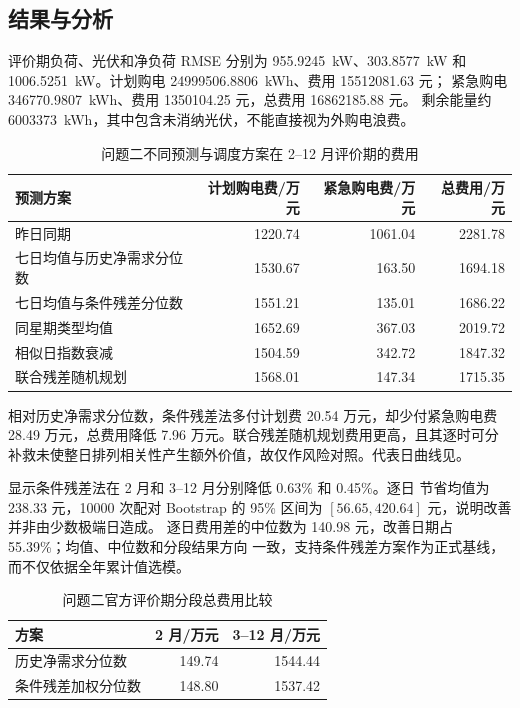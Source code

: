 \documentclass[withoutpreface,bwprint]{cumcmthesis}
\begin{document}
\subsection{结果与分析}

评价期负荷、光伏和净负荷 RMSE 分别为 \SI{955.9245}{kW}、\SI{303.8577}{kW} 和
\SI{1006.5251}{kW}。计划购电 \SI{24999506.8806}{kWh}、费用 \num{15512081.63} 元；
紧急购电 \SI{346770.9807}{kWh}、费用 \num{1350104.25} 元，总费用 \num{16862185.88} 元。
剩余能量约 \SI{6003373}{kWh}，其中包含未消纳光伏，不能直接视为外购电浪费。

\begin{table}[H]
  \centering
  \caption{问题二不同预测与调度方案在 2--12 月评价期的费用}
  \label{tab:q2-comparison}
  \begin{tabular}{lrrr}
    \toprule
    预测方案 & 计划购电费/万元 & 紧急购电费/万元 & 总费用/万元 \\
    \midrule
    昨日同期 & 1220.74 & 1061.04 & 2281.78 \\
    七日均值与历史净需求分位数 & 1530.67 & 163.50 & 1694.18 \\
    七日均值与条件残差分位数 & 1551.21 & 135.01 & 1686.22 \\
    同星期类型均值 & 1652.69 & 367.03 & 2019.72 \\
    相似日指数衰减 & 1504.59 & 342.72 & 1847.32 \\
    联合残差随机规划 & 1568.01 & 147.34 & 1715.35 \\
    \bottomrule
  \end{tabular}
\end{table}

相对历史净需求分位数，条件残差法多付计划费 \num{20.54} 万元，却少付紧急购电费
\num{28.49} 万元，总费用降低 \num{7.96} 万元。联合残差随机规划费用更高，且其逐时可分
补救未使整日排列相关性产生额外价值，故仅作风险对照。代表日曲线见。

 显示条件残差法在 2 月和 3--12 月分别降低 0.63\% 和 0.45\%。逐日
节省均值为 \num{238.33} 元，\num{10000} 次配对 Bootstrap 的 95\% 区间为
$[\num{56.65},\num{420.64}]$ 元，说明改善并非由少数极端日造成。
逐日费用差的中位数为 \num{140.98} 元，改善日期占 55.39\%；均值、中位数和分段结果方向
一致，支持条件残差方案作为正式基线，而不仅依据全年累计值选模。

\begin{table}[H]
  \centering
  \caption{问题二官方评价期分段总费用比较}
  \label{tab:q2-holdout}
  \begin{tabular}{lrr}
    \toprule
    方案 & 2 月/万元 & 3--12 月/万元 \\
    \midrule
    历史净需求分位数 & 149.74 & 1544.44 \\
    条件残差加权分位数 & 148.80 & 1537.42 \\
    \bottomrule
  \end{tabular}
\end{table}
\end{document}
